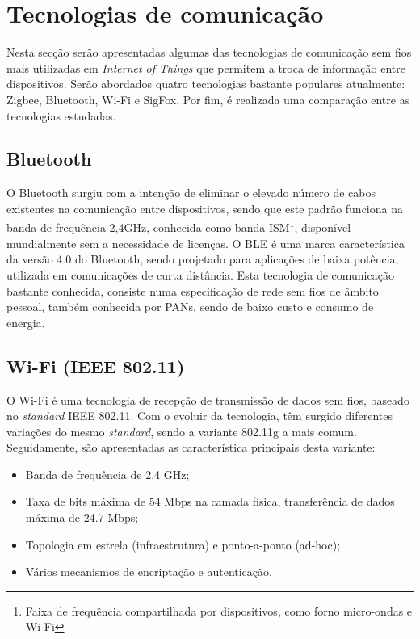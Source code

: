 \section{Tecnologias de comunicação}
\label{state-tecc}
Nesta secção serão apresentadas algumas das tecnologias de comunicação sem fios mais utilizadas em \textit{Internet of Things} que permitem a troca de informação entre dispositivos. Serão abordados quatro tecnologias bastante populares atualmente: Zigbee, Bluetooth, Wi-Fi e SigFox. Por fim, é realizada uma comparação entre as tecnologias estudadas. 



	




\subsection{Bluetooth}

O Bluetooth surgiu com a intenção de eliminar o elevado número de cabos existentes na comunicação entre dispositivos, sendo que este padrão funciona na banda de frequência 2,4GHz, conhecida como banda \ac{ISM}\footnote{Faixa de frequência compartilhada por dispositivos, como forno micro-ondas e Wi-Fi}, disponível mundialmente sem a necessidade de licenças. O \ac{BLE} é uma marca característica da versão 4.0 do Bluetooth, sendo projetado para aplicações de baixa potência, utilizada em comunicações de curta distância. Esta tecnologia de comunicação bastante conhecida, consiste numa especificação de rede sem fios de âmbito pessoal, também conhecida por \ac{PANs}, sendo de baixo custo e consumo de energia\cite{Bruno2002}\cite{BluetoothTM2001}.






\subsection{Wi-Fi (IEEE 802.11)}


O Wi-Fi é uma tecnologia de recepção de transmissão de dados sem fios, baseado no \textit{standard} IEEE 802.11. Com o evoluir da tecnologia, têm surgido diferentes variações do mesmo \textit{standard}, sendo a variante 802.11g a mais comum. Seguidamente, são apresentadas as característica principais desta variante\cite{Paper2005}\cite{urlwifi}:


\begin{itemize}
	\item Banda de frequência de 2.4 GHz;
	\item Taxa de bits máxima de 54 Mbps na camada física, transferência de dados máxima de 24.7 Mbps;
	\item Topologia em estrela (infraestrutura) e ponto-a-ponto (ad-hoc);
	\item Vários mecanismos de encriptação e autenticação.
\end{itemize}



